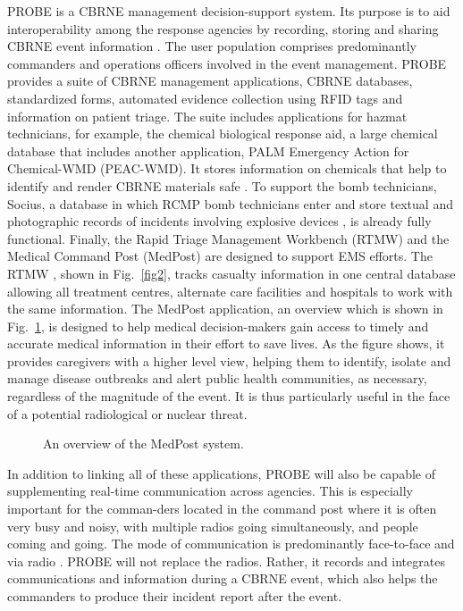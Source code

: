 \documentclass[link]{IWCOMP}
\begin{document}
PROBE is a CBRNE management decision-support system. Its purpose is to aid
interoperability among the response agencies by recording, storing and
sharing CBRNE event information \citep{bib1}. The user population comprises
predominantly commanders and operations officers involved in the event
management. PROBE provides a suite of CBRNE management applications, CBRNE
databases, standardized forms, automated evidence collection using RFID tags
and information on patient triage. The suite includes applications for
hazmat technicians, for example, the chemical biological response aid, a
large chemical database that includes another application, PALM Emergency
Action for Chemical-WMD (PEAC-WMD). It stores information on chemicals that
help to identify and render CBRNE materials safe \citep{bib1}. To support
the bomb technicians, Socius, a database in which RCMP bomb technicians
enter and store textual and photographic records of incidents involving
explosive devices \citep{bib1}, is already fully functional. Finally, the
Rapid Triage Management Workbench (RTMW) and the Medical Command Post
(MedPost) are designed to support EMS efforts. The RTMW \citep{bib26},
shown in Fig.~\ref{fig2}, tracks casualty information in one central database
allowing all treatment centres, alternate care facilities and hospitals to
work with the same information. The MedPost application, an overview which
is shown in Fig.~\ref{fig3}, is designed to help medical decision-makers gain access
to timely and accurate medical information in their effort to save lives. As
the figure shows, it provides caregivers with a higher level view, helping
them to identify, isolate and manage disease outbreaks and alert public
health communities, as necessary, regardless of the magnitude of the event.
It is thus particularly useful in the face of a potential radiological or
nuclear threat.

\begin{figure}[hbt!]
\centerline{}
\caption{An overview of the MedPost system.\label{fig3}}
\end{figure}

In addition to linking all of these applications, PROBE will also be capable
of supplementing real-time communication across agencies. This is especially
important for the comman-\break ders located in the command post where it is often
very busy and noisy, with multiple radios going simultaneously, and people
coming and going. The mode of communication is predominantly face-to-face
and via radio \citep{bib12}. PROBE will not replace the radios.
Rather, it records and integrates communications and information during a
CBRNE event, which also helps the commanders to produce their incident
report after the event.
\end{document}
